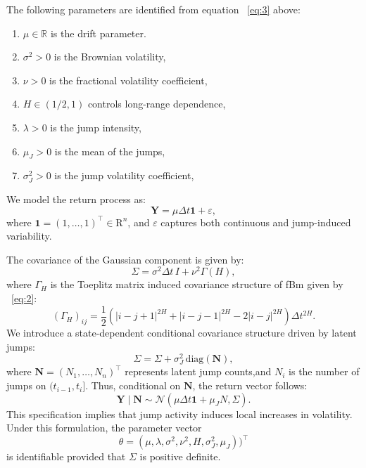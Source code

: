 \documentclass[a4paper,11pt]{amsart}
\theoremstyle{definition}
\theoremstyle{plain}
\theoremstyle{remark}
\newcommand{\R}{\mathrm{R}}
\newcommand{\1}{\mathbf{1}}
\begin{document}
The following parameters are identified from equation ~\ref{eq:3} above: 
\begin{enumerate}[label=(\roman*)]
\item $\mu \in \mathbb{R}$ is the drift parameter.
\item $\sigma^2 > 0$ is the Brownian volatility,
\item $\nu > 0$ is the fractional volatility coefficient,
\item $H \in (1/2,1)$ controls long-range dependence,
\item $\lambda > 0$ is the jump intensity,
\item $\mu_J > 0$ is the mean of the jumps,
\item $\sigma^2_J > 0$ is the jump volatility coefficient,
\end{enumerate}
We model the return process as:
\begin{equation*}
	\mathbf{Y} = \mu \Delta t \mathbf{1} + \varepsilon,
\end{equation*}
where {$\mathbf{1}=(1,\ldots,1)^\top\in\R^n$, and} $\varepsilon$ captures both continuous and jump-induced variability.

The covariance of the Gaussian component is given by:
\begin{equation*}
	\Sigma = \sigma^2 \Delta t\, I + \nu^2 \Gamma(H),
\end{equation*}
where $\Gamma_H$ is the Toeplitz matrix induced covariance structure of fBm given by ~\ref{eq:2}:
\begin{equation*}
(\Gamma_H)_{ij} = \frac{1}{2}\left(|i-j+1|^{2H} + |i-j-1|^{2H} - 2|i-j|^{2H}\right)\Delta t^{2H}.
\end{equation*}
We introduce a state-dependent conditional covariance structure driven by latent jumps:
\begin{equation*}
	\Sigma = \Sigma + \sigma_J^2 \,\mathrm{diag}(\mathbf{N}),
\end{equation*}
where $\mathbf{N} = (N_1,\dots,N_n)^\top$ represents latent jump counts,{and $N_i$ is the number of jumps on $(t_{i-1}, t_i]$.}
Thus, conditional on $\mathbf{N}$, the return vector follows:
\begin{equation*}
	\mathbf{Y} \mid \mathbf{N} \sim \mathcal{N}(\mu \Delta t \mathbf{1}+\mu_J N, \Sigma).
\end{equation*}
This specification implies that jump activity induces local increases in volatility. Under this formulation, the parameter vector
\begin{equation}
 \label{eq:4}   
\theta = (\mu,\lambda, \sigma^2, \nu^2, H,\sigma^2_J, \mu_J))^\top
\end{equation}
is identifiable provided that $\Sigma$ is positive definite.
\end{document}
